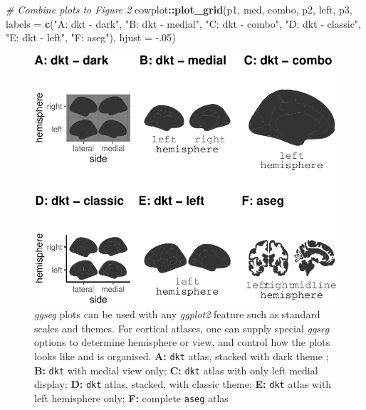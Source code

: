 \documentclass[fleqn,10pt]{wlpeerj} %
\newenvironment{Shaded}{\begin{snugshade}}{\end{snugshade}}
\newcommand{\CommentTok}[1]{\textcolor[rgb]{0.56,0.35,0.01}{\textit{#1}}}
\newcommand{\DataTypeTok}[1]{\textcolor[rgb]{0.13,0.29,0.53}{#1}}
\newcommand{\FloatTok}[1]{\textcolor[rgb]{0.00,0.00,0.81}{#1}}
\newcommand{\KeywordTok}[1]{\textcolor[rgb]{0.13,0.29,0.53}{\textbf{#1}}}
\newcommand{\NormalTok}[1]{#1}
\newcommand{\OperatorTok}[1]{\textcolor[rgb]{0.81,0.36,0.00}{\textbf{#1}}}
\newcommand{\StringTok}[1]{\textcolor[rgb]{0.31,0.60,0.02}{#1}}
\begin{document}
\begin{Shaded}
\begin{Highlighting}[]
\CommentTok{\# Combine plots to Figure 2}
\NormalTok{cowplot}\OperatorTok{::}\KeywordTok{plot\_grid}\NormalTok{(p1, med, combo,  p2, left, p3,}
                   \DataTypeTok{labels =} \KeywordTok{c}\NormalTok{(}\StringTok{"A: dkt {-} dark"}\NormalTok{, }\StringTok{"B: dkt {-} medial"}\NormalTok{,}
                              \StringTok{"C: dkt {-} combo"}\NormalTok{, }\StringTok{"D: dkt {-} classic"}\NormalTok{,}
                              \StringTok{"E: dkt {-} left"}\NormalTok{, }\StringTok{"F: aseg"}\NormalTok{),}
                   \DataTypeTok{hjust =} \FloatTok{{-}.05}\NormalTok{)}
\end{Highlighting}
\end{Shaded}

\begin{figure}
\centering
\includegraphics{draft_2_files/figure-latex/collection-1.pdf}
\caption{\label{fig:collection}\emph{ggseg} plots can be used with any \emph{ggplot2} feature such as standard scales and themes. For cortical atlases, one can supply special \emph{ggseg} options to determine hemisphere or view, and control how the plots looks like and is organised. \textbf{A:} \texttt{dkt} atlas, stacked with dark theme ; \textbf{B:} \texttt{dkt} with medial view only; \textbf{C:} \texttt{dkt} atlas with only left medial display; \textbf{D:} \texttt{dkt} atlas, stacked, with classic theme; \textbf{E:} \texttt{dkt} atlas with left hemisphere only; \textbf{F:} complete \texttt{aseg} atlas}
\end{figure}
\end{document}
